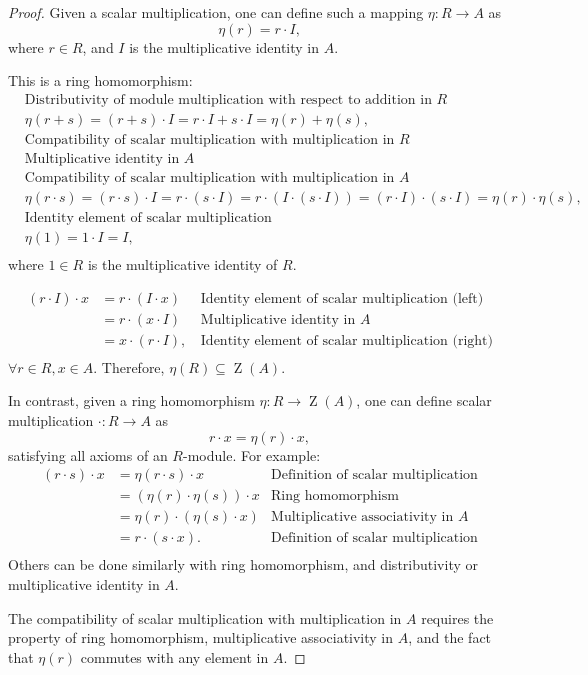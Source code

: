 \documentclass[12pt, letterpaper]{article}
\newcommand{\ZZ}{\operatorname{Z}}
\theoremstyle{definition}
\theoremstyle{remark}
\theoremstyle{definition}
\theoremstyle{plain}
\numberwithin{equation}{section}
\begin{document}
	\begin{proof}
		Given a scalar multiplication, one can define such a mapping $\eta\colon R\to A$ as
		\[ \eta(r)=r\cdot I,\]
		where $r\in R$, and $I$ is the multiplicative identity in $A$.
		
		This is a ring homomorphism:
		\[
		\begin{aligned}
			&\text{Distributivity of module multiplication with respect to addition in }R\\
			&\eta(r+s)=(r+s)\cdot I=r\cdot I+s\cdot I=\eta(r)+\eta(s),\\
			&\text{Compatibility of scalar multiplication with multiplication in }R\\
			&\text{Multiplicative identity in }A\\
			&\text{Compatibility of scalar multiplication with multiplication in }A\\
			&\eta(r\cdot s)=(r\cdot s)\cdot I=r\cdot(s\cdot I)=r\cdot(I\cdot(s\cdot I))=(r\cdot I)\cdot(s\cdot I)=\eta(r)\cdot\eta(s),\\
			&\text{Identity element of scalar multiplication}\\
			&\eta(1)=1\cdot I=I,\\
		\end{aligned}
		\]
		where $1\in R$ is the multiplicative identity of $R$.
		
		\[
		\begin{aligned}
			(r\cdot I)\cdot x&=r\cdot(I\cdot x)&\,\text{Identity element of scalar multiplication (left)}\\
			&=r\cdot (x\cdot I)&\,\text{Multiplicative identity in }A\\
			&=x\cdot(r\cdot I),&\,\text{Identity element of scalar multiplication (right)}\\
		\end{aligned}
		\]
		$\forall r \in R, x\in A$.
		Therefore, $\eta(R)\subseteq \ZZ(A)$.
		
		In contrast, given a ring homomorphism $\eta\colon R\to \ZZ(A)$,
		one can define scalar multiplication $\cdot\colon R\to A$ as
		\[r\cdot x = \eta(r) \cdot x,\]
		satisfying all axioms of an $R$-module. For example:
		\[
		\begin{aligned}
			(r\cdot s)\cdot x&=\eta(r\cdot s)\cdot x&\text{Definition of scalar multiplication}\\
			&=(\eta(r)\cdot\eta(s))\cdot x&\text{Ring homomorphism}\\
			&=\eta(r)\cdot(\eta(s)\cdot x)&\text{Multiplicative associativity in }A\\
			&=r\cdot(s\cdot x).&\text{Definition of scalar multiplication}\\
		\end{aligned}
		\]
		Others can be done similarly with ring homomorphism, and distributivity or multiplicative identity in $A$.
		
		The compatibility of scalar multiplication with multiplication in $A$
		requires the property of ring homomorphism, multiplicative associativity in $A$,
		and the fact that $\eta(r)$ commutes with any element in $A$.
	\end{proof}
\end{document}
